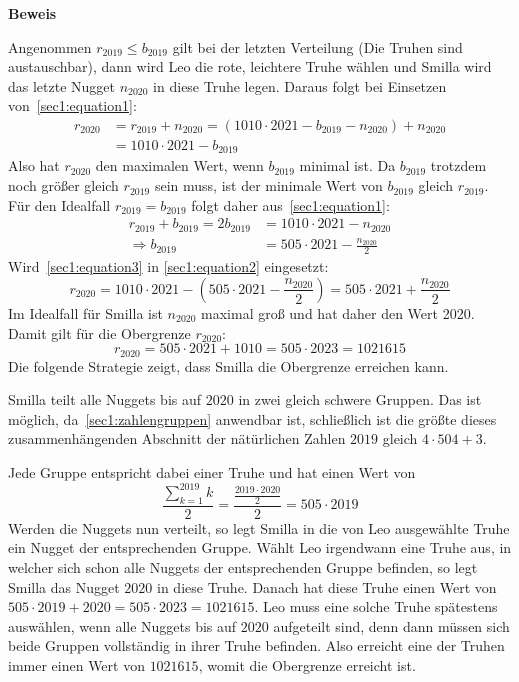 \documentclass[10pt, a4paper, reqno]{amsart}
\makeatletter
\renewcommand\proofname{Beweis}
\renewenvironment{proof}[1][\proofname]{\par
\pushQED{\qed}%
\normalfont \topsep6\p@\@plus6\p@\relax
\trivlist
\item\relax
{\bfseries#1}\hspace\labelsep\ignorespaces
}{%
\popQED\endtrivlist\@endpefalse
}
\makeatother
\begin{document}
\begin{proof}
  Angenommen $r_{2019}\leq b_{2019}$ gilt bei der letzten Verteilung (Die Truhen sind
  austauschbar), dann wird Leo die rote, leichtere Truhe wählen und Smilla wird das letzte
  Nugget $n_{2020}$ in diese Truhe legen. Daraus folgt bei Einsetzen von~\eqref{sec1:equation1}:
  \begin{equation}\label{sec1:equation2}
    \begin{split}
      r_{2020}&=r_{2019}+n_{2020}=(1010\cdot2021-b_{2019}-n_{2020})+n_{2020}\\
       &= 1010\cdot2021-b_{2019}
    \end{split}
  \end{equation}
  Also hat $r_{2020}$ den maximalen Wert, wenn $b_{2019}$ minimal ist. Da
  $b_{2019}$ trotzdem noch größer gleich $r_{2019}$ sein muss, ist der minimale Wert von
  $b_{2019}$ gleich $r_{2019}$. Für den Idealfall $r_{2019}=b_{2019}$ folgt
  daher aus~\eqref{sec1:equation1}:
  \begin{equation}\label{sec1:equation3}
    \begin{split}
      r_{2019} + b_{2019}= 2b_{2019} &=1010\cdot2021-n_{2020}\\
      \Rightarrow b_{2019} &=505\cdot2021-\frac{n_{2020}}{2}
    \end{split}
  \end{equation}
  Wird~\eqref{sec1:equation3} in \eqref{sec1:equation2} eingesetzt:
  \begin{equation*}
    r_{2020}= 1010\cdot2021 -(505\cdot2021 - \frac{n_{2020}}{2})=505\cdot2021+\frac{n_{2020}}{2}
  \end{equation*}
  Im Idealfall für Smilla ist $n_{2020}$ maximal groß und hat daher den Wert
  2020. Damit gilt für die Obergrenze $r_{2020}$:
  \begin{equation*}
    r_{2020}=505\cdot2021+1010 = 505\cdot2023 = 1021615
  \end{equation*}
  Die folgende Strategie zeigt, dass Smilla die Obergrenze erreichen kann.

  Smilla teilt alle Nuggets bis auf $2020$ in zwei gleich schwere Gruppen. Das
  ist möglich, da~\autoref{sec1:zahlengruppen} anwendbar ist, schließlich
  ist die größte dieses zusammenhängenden Abschnitt der nätürlichen Zahlen
  $2019$ gleich $4\cdot504 + 3$.

  Jede Gruppe entspricht dabei einer Truhe und hat einen Wert von
  \[\frac{\sum^{2019}_{k=1}k}{2} = \frac{\frac{2019\cdot2020}{2}}{2} =
    505\cdot2019\] Werden die Nuggets nun verteilt, so legt Smilla in die von
  Leo ausgewählte Truhe ein Nugget der entsprechenden Gruppe. Wählt Leo
  irgendwann eine Truhe aus, in welcher sich schon alle Nuggets der
  entsprechenden Gruppe befinden, so legt Smilla das Nugget $2020$ in diese
  Truhe. Danach hat diese Truhe einen Wert von
  $505\cdot2019+2020=505\cdot2023= 1021615$. Leo muss eine solche Truhe
  spätestens auswählen, wenn alle Nuggets bis auf $2020$ aufgeteilt sind, denn
  dann müssen sich beide Gruppen vollständig in ihrer Truhe befinden. Also
  erreicht eine der Truhen immer einen Wert von $1021615$, womit die Obergrenze
  erreicht ist.
\end{proof}
\end{document}
